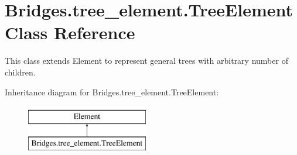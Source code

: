 \hypertarget{class_bridges_1_1tree__element_1_1_tree_element}{}\section{Bridges.\+tree\+\_\+element.\+Tree\+Element Class Reference}
\label{class_bridges_1_1tree__element_1_1_tree_element}


This class extends Element to represent general trees with arbitrary number of children.  


Inheritance diagram for Bridges.\+tree\+\_\+element.\+Tree\+Element\+:\begin{figure}[H]
\begin{center}
\leavevmode
\includegraphics[height=2.000000cm]{class_bridges_1_1tree__element_1_1_tree_element}
\end{center}
\end{figure}
